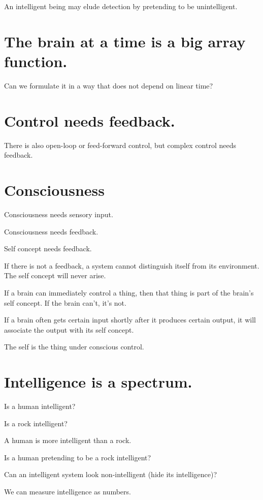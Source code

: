 An intelligent being may elude detection by pretending to be unintelligent.

\section{The brain at a time is a big array function.}

Can we formulate it in a way that does not depend on linear time?

\section{Control needs feedback.}

There is also open-loop or feed-forward control,
but complex control needs feedback.

\section{Consciousness}

Consciousness needs sensory input.

Consciousness needs feedback.

Self concept needs feedback.

If there is not a feedback, a system cannot distinguish itself from its environment.
The self concept will never arise.

If a brain can immediately control a thing,
then that thing is part of the brain's self concept.
If the brain can't, it's not.

If a brain often gets certain input shortly after it produces certain output,
it will associate the output with its self concept.

The self is the thing under conscious control.

\section{Intelligence is a spectrum.}

Is a human intelligent?

Is a rock intelligent?

A human is more intelligent than a rock.

Is a human pretending to be a rock intelligent?

Can an intelligent system look non-intelligent (hide its intelligence)?

We can measure intelligence as numbers.

